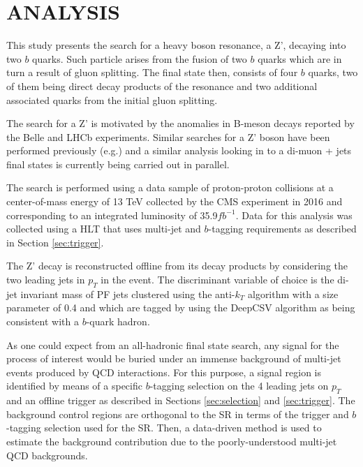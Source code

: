 %
%
%
%



\chapter{ANALYSIS \label{cha:analysis}}

This study presents the search for a heavy boson resonance, a Z', decaying into two $b$ quarks. Such particle arises from the fusion of two $b$ quarks which are in turn a result of gluon splitting. The final state then, consists of four $b$ quarks, two of them being direct decay products of the resonance and two additional associated quarks from the initial gluon splitting.

The search for a Z' is motivated by the anomalies in B-meson decays reported by the Belle and LHCb experiments. Similar searches for a Z' boson have been performed previously (e.g.) and a similar analysis looking in to a di-muon + jets final states is currently being carried out in parallel\cite{PhysRevD.97.075035}.

The search is performed using a data sample of proton-proton collisions at a center-of-mass energy of 13 TeV collected by the CMS experiment in 2016 and corresponding to an integrated luminosity of 35.9$fb^{-1}$. Data for this analysis was collected using a HLT that uses multi-jet and $b$-tagging requirements as described in Section \ref{sec:trigger}.

The Z' decay is reconstructed offline from its decay products by considering the two leading jets in $p_{T}$ in the event. The discriminant variable of choice is the di-jet invariant mass of PF jets clustered using the anti-$k_{T}$ algorithm with a size parameter of 0.4 and which are tagged by using the DeepCSV algorithm as being consistent with a $b$-quark hadron. 

As one could expect from an all-hadronic final state search, any signal for the process of interest would be buried under an immense background of multi-jet events produced by QCD interactions. For this purpose, a signal region is identified by means of a specific $b$-tagging selection on the 4 leading jets on $p_{T}$ and an offline trigger as described in Sections \ref{sec:selection} and \ref{sec:trigger}. The background control regions are orthogonal to the SR in terms of the trigger and $b$-tagging selection used for the SR. Then, a data-driven method is used to estimate the background contribution due to the poorly-understood multi-jet QCD backgrounds. 

